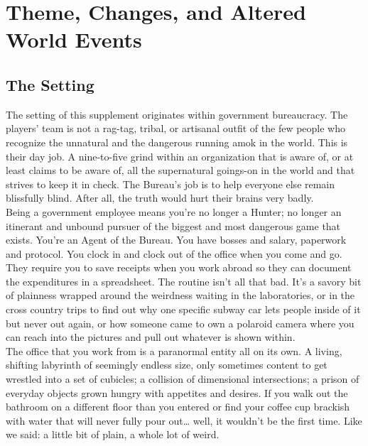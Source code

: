 \documentclass[12pt,oneside,landscape]{memoir}
\begin{document}
\chapter*{Theme, Changes, and Altered World Events}
\begin{multicols}{2}

\section*{The Setting}
The setting of this supplement originates within government bureaucracy.  The players’ team is not a rag-tag, tribal, or artisanal outfit of the few people who recognize the unnatural and the dangerous running amok in the world.  This is their day job.  A nine-to-five grind within an organization that is aware of, or at least claims to be aware of, all the supernatural goings-on in the world and that strives to keep it in check.  The Bureau’s job is to help everyone else remain blissfully blind.  After all, the truth would hurt their brains very badly.
\\[4mm]
Being a government employee means you’re no longer a Hunter; no longer an itinerant and unbound pursuer of the biggest and most dangerous game that exists.  You’re an Agent of the Bureau.  You have bosses and salary, paperwork and protocol.  You clock in and clock out of the office when you come and go.  They require you to save receipts when you work abroad so they can document the expenditures in a spreadsheet.  The routine isn’t all that bad.  It’s a savory bit of plainness wrapped around the weirdness waiting in the laboratories, or in the cross country trips to find out why one specific subway car lets people inside of it but never out again, or how someone came to own a polaroid camera where you can reach into the pictures and pull out whatever is shown within.
\\[4mm]
The office that you work from is a paranormal entity all on its own.  A living, shifting labyrinth of seemingly endless size, only sometimes content to get wrestled into a set of cubicles; a collision of dimensional intersections; a prison of everyday objects grown hungry with appetites and desires.  If you walk out the bathroom on a different floor than you entered or find your coffee cup brackish with water that will never fully pour out… well, it wouldn’t be the first time.  Like we said: a little bit of plain, a whole lot of weird.


\end{multicols}
\end{document}
